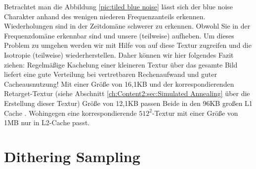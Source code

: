 Betrachtet man die Abbildung \ref{pic:tiled blue noise} lässt sich der blue noise Charakter anhand des
wenigen niederen Frequenzanteils erkennen. Wiederholungen sind in der Zeitdomäne schwerer zu erkennen. 
Obwohl Sie in der Frequenzdomäne erkennbar sind und unsere 
(teilweise) aufheben. Um dieses Problem zu umgehen werden wir mit Hilfe von 
auf diese Textur zugreifen und die Isotropie (teilweise) wiederherstellen.
Daher können wir hier folgendes Fazit ziehen: Regelmäßige Kachelung einer kleineren  Textur 
über das gesamte Bild liefert eine gute  Verteilung bei vertretbaren Rechenaufwand und guter 
Cacheausnutzung! Mit einer Größe von 16,1KB und der korrespondierenden Retarget-Textur (siehe Abschnitt \ref{ch:Content2:sec:Simulated Annealing}
über die Erstellung dieser Textur) Größe von 12,1KB passen Beide in den 96KB großen L1 Cache \cite{turingarchitecture}. Wohingegen 
eine korrespondierende $512^{2}$-Textur mit einer Größe von 1MB nur in L2-Cache passt.

\section{Dithering Sampling}
\label{ch:Content1:sec:blue noise sampling}

